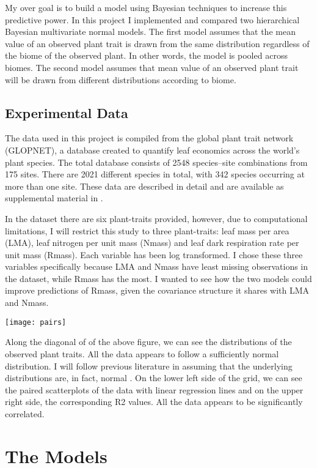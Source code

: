 \documentclass[11pt]{article}
\theoremstyle{definition}
\theoremstyle{remark}
\theoremstyle{definition}
\begin{document}
My over goal is to build a model using Bayesian techniques to increase this predictive power. In this project I implemented and compared two hierarchical Bayesian multivariate normal models. The first model assumes that the mean value of an observed plant trait is drawn from the same distribution regardless of the biome of the observed plant. In other words, the model is pooled across biomes. The second model assumes that mean value of an observed plant trait will be drawn from different distributions according to biome. 


\subsection{Experimental Data}

The data used in this project is compiled from the global plant trait network (GLOPNET), a database created to quantify leaf economics across the world’s plant species. The total database consists of 2548 species–site combinations from 175 sites. There are 2021 different species in total, with 342 species occurring at more than one site. These data are described in detail and are available as supplemental material in \citep{Wright}. 

In the dataset there are six plant-traits provided, however, due to computational limitations, I will restrict this study to three plant-traits: leaf mass per area (LMA), leaf nitrogen per unit mass (Nmass) and leaf dark respiration rate per unit mass (Rmass). Each variable has been log transformed. I chose these three variables specifically because LMA and Nmass have least missing observations in the dataset, while Rmass has the most. I wanted to see how the two models could improve predictions of Rmass, given the covariance structure it shares with LMA and Nmass. 

\texttt{[image: pairs]}

Along the diagonal of of the above figure, we can see the distributions of the observed plant traits. All the data appears to follow a sufficiently normal distribution. I will follow previous literature in assuming that the underlying distributions are, in fact, normal \citep{LEBAUER2013}. On the lower left side of the grid, we can see the paired scatterplots of the data with linear regression lines and on the upper right side, the corresponding R2 values. All the data appears to be significantly correlated. 

\section{The Models}
\end{document}
